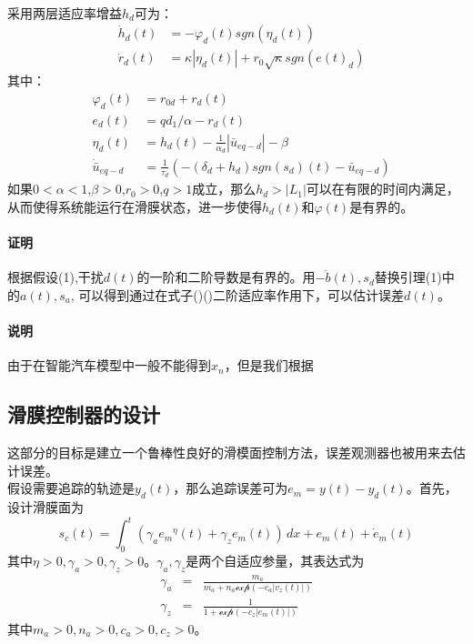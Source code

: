 \documentclass{cjc}
\begin{document}
    \paragraph{}
    采用两层适应率增益$h_d$可为：
    \begin{eqnarray}
      &\dot{h}_d(t) &= - \varphi_d (t) sgn(\eta  _d(t))  \\
      &\dot{r}_d(t) &= \kappa |\eta_d (t)| + r_0 \sqrt{\kappa }sgn(e(t)_d)
    \end{eqnarray}
    其中：
    \begin{eqnarray}
      &\varphi_d (t) &= r_{0d} + r_d(t) \\
      &e_d(t)& = q d_1/\alpha  - r_d(t) \\
      &\eta_d  (t) &= h_d(t) - \frac{1}{\alpha_d}|\bar{u}_{eq-d}| - \beta \\
      &\dot{\bar{u}}_{eq-d} &= \frac{1}{\tau _d}(-(\delta_d + h_d )sgn(s_d)(t)-\bar{u}_{eq-d})
    \end{eqnarray}
    如果$0 <\alpha <1$,\quad $\beta >0$,\quad $r_0>0$,\quad$q>1$成立，那么$h_d > |L_1|$可以在有限的时间内满足，
    从而使得系统能运行在滑膜状态，进一步使得$h_d(t)$和$\varphi(t)$是有界的。
    
  \paragraph*{证明}
    根据假设(1),干扰$d(t)$的一阶和二阶导数是有界的。用$-\dot{b}(t),s_d$替换引理(1)中的$a(t),s_a$,
    可以得到通过在式子()(){\color{red}二阶适应率}作用下，可以估计误差$d(t)$。
  \paragraph*{说明}
    由于在智能汽车模型中一般不能得到$x_n$，但是我们根据

  \subsection{滑膜控制器的设计}
    这部分的目标是建立一个鲁棒性良好的滑模面控制方法，误差观测器也被用来去估计误差。\\
    假设需要追踪的轨迹是$y_d(t)$，那么追踪误差可为$e_m = y(t) - y_d(t)$。首先，设计滑膜面为\:
    \begin{equation}
      s_c(t) = \int_{0}^{t} (\gamma_a{e_m}^\eta(t) + \gamma _z e_m(t)) \,dx
      + e_m(t) + \dot{e}_m(t)
    \end{equation}
    其中$\eta > 0 ,\gamma _a > 0,\gamma _z >0 $。$\gamma_a,\gamma _z$是两个自适应参量，其表达式为\:
    \begin{eqnarray*}
      \gamma _a &=& \frac{m_a}{m_a + n_a \mathcal{exp}(-c_a|v_z(t)|)} \nonumber \\
      \gamma _z &=& \frac{1}{1+\mathcal{exp}(-c_z|e_m(t)|)}\nonumber
    \end{eqnarray*}
    其中$m_a > 0,n_a >0 , c_a >0, c_z >0$。
\end{document}
